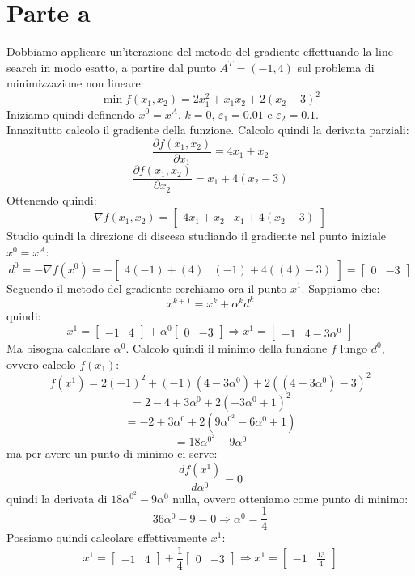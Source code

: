 \documentclass[a4paper,12pt, oneside]{book}
\begin{document}
\section{Parte a}
Dobbiamo applicare un'iterazione del metodo del gradiente effettuando
la line-search in modo esatto, a partire dal punto $A^T=(-1,4)$ sul
problema di minimizzazione non lineare:
\[\min f(x_1,x_2)=2x_1^2+x_1x_2+2(x_2-3)^2\]
Iniziamo quindi definendo $x^0=x^A$, $k=0$, $\varepsilon_1=0.01$ e
$\varepsilon_2=0.1$.\\
Innazitutto calcolo il gradiente della funzione. Calcolo quindi la
derivata parziali:
\[\frac{\partial f(x_1,x_2)}{\partial x_1}=4x_1+x_2\]
\[\frac{\partial f(x_1,x_2)}{\partial x_2}=x_1+4(x_2-3)\]
Ottenendo quindi:
\[\nabla f(x_1,x_2)=[
  \begin{matrix}
    4x_1+x_2 & x_1+4(x_2-3)
  \end{matrix}]
\]
Studio quindi la direzione di discesa studiando il gradiente nel punto
iniziale $x^0=x^A$:
\[d^0=-\nabla f(x^0)=-[
  \begin{matrix}
    4(-1)+(4) & (-1)+4((4)-3)
  \end{matrix}]=[
  \begin{matrix}
    0 & -3
  \end{matrix}]
\]
Seguendo il metodo del gradiente cerchiamo ora il punto
$x^1$. Sappiamo che:
\[x^{k+1}=x^k+\alpha^k d^k\]
quindi:
\[x^1=[
  \begin{matrix}
    -1 & 4
  \end{matrix}]+\alpha^0[
  \begin{matrix}
    0 & -3
  \end{matrix}]\Longrightarrow x^1=[
  \begin{matrix}
    -1 & 4-3\alpha^0
  \end{matrix}]
\]
\newpage
Ma bisogna calcolare $\alpha^0$. Calcolo quindi il minimo della
funzione $f$ lungo $d^0$, ovvero calcolo $f(x_1)$:
\[f(x^1)=2(-1)^2+(-1)(4-3\alpha^0)+2((4-3\alpha^0)-3)^2\]
\[=2-4+3\alpha^0+2(-3\alpha^0+1)^2\]
\[=-2+3\alpha^0+2(9\alpha^{{0}^2}-6\alpha^0+1)\]
\[=18\alpha^{{0}^2}-9\alpha^0\]
ma per avere un punto di minimo ci serve:
\[\frac{d f(x^1)}{d\alpha^0}=0\]
quindi la derivata di $18\alpha^{{0}^2}-9\alpha^0$ nulla, ovvero
otteniamo come punto di minimo:
\[36\alpha^0-9=0\Longrightarrow\alpha^0=\frac{1}{4}\]
Possiamo quindi calcolare effettivamente $x^1$:
\[x^1=[
  \begin{matrix}
    -1 & 4
  \end{matrix}]+\frac{1}{4}[
  \begin{matrix}
    0 & -3
  \end{matrix}]\Longrightarrow x^1=[
  \begin{matrix}
    -1 & \frac{13}{4}
  \end{matrix}]
\]
\end{document}

